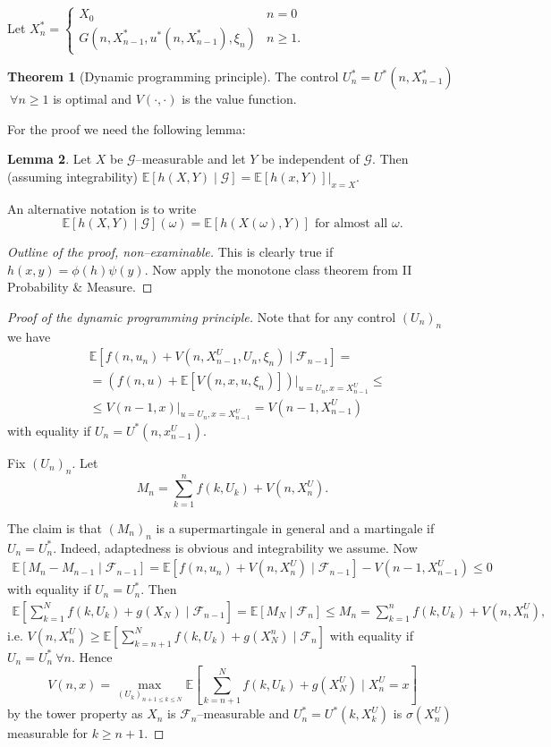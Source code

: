 \documentclass{article}
\theoremstyle{definition}
\newtheorem{theorem}{Theorem}[section]
\newtheorem{lemma}[theorem]{Lemma}
\begin{document}
Let $X^*_n = \begin{cases}
    X_0 &n=0\\
    G(n,X_{n-1}^*, u^*(n,X_{n-1}^*),\xi_n) &n\ge 1.
\end{cases}$
\begin{theorem}[Dynamic programming principle]
    The control $U^*_n = U^*(n,X_{n-1}^*)$ $~\forall n\ge 1$ is optimal and $V(\cdot ,\cdot )$ is the value function.
\end{theorem}
For the proof we need the following lemma:
\begin{lemma}
    Let $X$ be $\mathcal{G}$--measurable and let $Y$ be independent of $\mathcal{G}$. Then (assuming integrability) $\mathbb{E}[h(X,Y) \mid \mathcal{G}] = \mathbb{E}[h(x,Y)]|_{x=X}.$
    \vspace{1mm}
    
    An alternative notation is to write \[
    \mathbb{E}[h(X,Y) \mid \mathcal{G}](\omega) = \mathbb{E}[h(X(\omega),Y)] \text{ for almost all }\omega.
    \]
\end{lemma}
\begin{proof}[Outline of the proof, non--examinable]
    This is clearly true if $h(x,y)=\phi(h)\psi(y)$. Now apply the monotone class theorem from II Probability \& Measure.
\end{proof}
\begin{proof}[Proof of the dynamic programming principle]
    Note that for any control $(U_n)_n$ we have 
    \begin{align*}
        &\mathbb{E}[f(n,u_n)+V(n,X_{n-1}^U,U_n,\xi_n) \mid \mathcal{F}_{n-1}] = \\
        &=(f(n,u)+\mathbb{E}[V(n,x,u,\xi_n)])|_{u=U_n,x=X_{n-1}^U} \le \\
        &\le V(n-1,x) |_{u=U_n,x=X_{n-1}^U} = V(n-1,X_{n-1}^U)
    \end{align*}
    with equality if $U_n=U^*(n,x_{n-1}^U)$.

    Fix $(U_n)_n$. Let \[
    M_n = \sum_{k=1}^{n} f(k,U_k) + V(n,X_n^U).
    \]

    The claim is that $(M_n)_n$ is a supermartingale in general and a martingale if $U_n=U^*_n$. Indeed, adaptedness is obvious and integrability we assume. Now
    \begin{align*}
        \mathbb{E}[M_n-M_{n-1} \mid \mathcal{F}_{n-1}] = \mathbb{E}[f(n,u_n) + V(n,X_n^U) \mid \mathcal{F}_{n-1}] - V(n-1,X_{n-1}^U) \le 0
    \end{align*}
    with equality if $U_n=U_n^*$. Then
    \begin{align*}
        \mathbb{E}\left[\sum_{k=1}^{N} f(k,U_k)+g(X_N) \mid \mathcal{F}_{n-1}\right] = \mathbb{E}[M_N \mid \mathcal{F}_{n}] \le M_n = \sum_{k=1}^{n} f(k,U_k)+V(n,X_n^U),
    \end{align*}
    i.e. $V(n,X_n^U) \ge \mathbb{E}[\sum_{k=n+1}^{N} f(k,U_k)+ g(X_N^n) \mid \mathcal{F}_n]$ with equality if $U_n=U_n^* ~\forall n$. Hence $$V(n,x) = \max_{(U_k)_{n+1\le k\le N}} \mathbb{E}\left[\sum_{k=n+1}^{N} f(k,U_k)+g(X_N^U) \mid X_n^U=x\right]$$
    by the tower property as $X_n$ is $\mathcal{F}_n$--measurable and $U_n^* = U^*(k,X_k^U)$ is $\sigma(X_n^U)$ measurable for $k \ge n+1$.
\end{proof}
\end{document}

